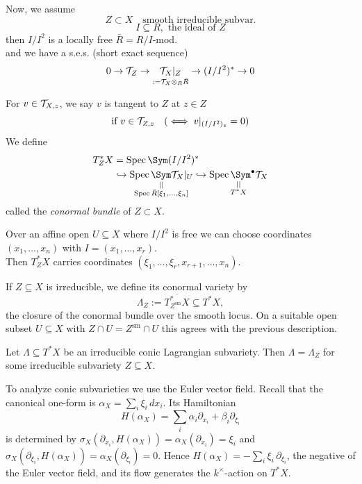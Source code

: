 \noindent Now, we assume
\[
    Z \subset X \quad \text{smooth irreducible subvar.}
\]
\[
    I \subseteq R, \text{ the ideal of } Z
\]
then $I/I^2$ is a locally free $\bar{R} = R/I$-mod.
\\
and we have a s.e.s. (short exact sequence)
\[
    0 \to \mathcal{T}_Z \to \underset{:= \mathcal{T}_X \otimes_R \bar{R}}{\mathcal{T}_X|_Z} \to (I/I^2)^* \to 0
\]

\noindent For $v \in \mathcal{T}_{X,z}$, we say $v$ is tangent to $Z$ at $z \in Z$
\[
    \text{if } v \in \mathcal{T}_{Z,z} \quad (\iff v|_{(I/I^2)_z} = 0)
\]
We define
\begin{align*}
    T^*_Z X & = \Spec \Sym (I/I^2)^*                        \\
            & \hookrightarrow \underset{\substack{\mid \mid \\ \Spec \bar{R}[\xi_1, \dots, \xi_n]}}{\Spec \Sym \Tv_X|_U} \hookrightarrow \underset{\substack{\mid \mid \\ T^*X}}{\Spec \Sym^\bullet \Tv_X}
\end{align*}
called the \emph{conormal bundle} of $Z \subset X$.

Over an affine open $U\subseteq X$
where $I/I^2$ is free we can choose coordinates $(x_1,\dots,x_n)$ with
$I=(x_1,\dots,x_r)$. \\
Then $T^\ast_Z X$ carries coordinates
$(\xi_1,\dots,\xi_r,x_{r+1},\dots,x_n)$.

If $Z\subseteq X$ is irreducible, we define its conormal variety by
\[
    \Lambda_Z := \overline{T^\ast_{Z^{\mathrm{sm}}} X}
    \subseteq T^\ast X,
\]
the closure of the conormal bundle over the smooth locus.  On a suitable open
subset $U\subseteq X$ with $Z\cap U=Z^{\mathrm{sm}}\cap U$ this agrees with the
previous description.

\begin{theorem}[Thm.~9.3]\label{thm:conic-lagrangian}
    Let $\Lambda\subseteq T^\ast X$ be an irreducible conic Lagrangian subvariety.
    Then $\Lambda=\Lambda_Z$ for some irreducible subvariety $Z\subseteq X$.
\end{theorem}

To analyze conic subvarieties we use the Euler vector field.  Recall that the
canonical one-form is $\alpha_X=\sum_i \xi_i\,dx_i$.  Its Hamiltonian
\[
    H(\alpha_X)=\sum_i \alpha_i\partial_{x_i}+\beta_i\partial_{\xi_i}
\]
is determined by $\sigma_X(\partial_{x_i},H(\alpha_X))=\alpha_X(\partial_{x_i})
    =\xi_i$ and $\sigma_X(\partial_{\xi_i},H(\alpha_X))=\alpha_X(\partial_{\xi_i})
    =0$.  Hence $H(\alpha_X)=-\sum_i \xi_i\,\partial_{\xi_i}$, the negative of the
Euler vector field, and its flow generates the $k^\times$-action on $T^\ast X$.

